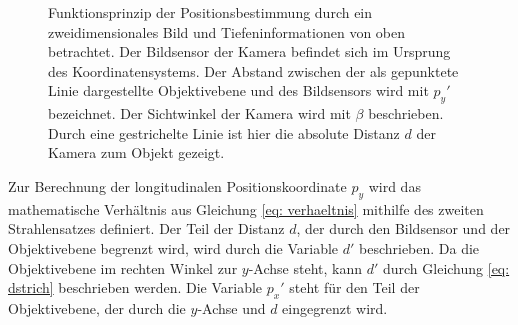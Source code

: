 			\begin{figure}[H]
			\centering
			
			\caption{Funktionsprinzip der Positionsbestimmung durch ein zweidimensionales Bild und Tiefeninformationen von oben betrachtet. Der Bildsensor der Kamera befindet sich im Ursprung des Koordinatensystems. Der Abstand zwischen der als gepunktete Linie dargestellte Objektivebene und des Bildsensors wird mit ${p_y}'$ bezeichnet. Der Sichtwinkel der Kamera wird mit $\beta$ beschrieben. Durch eine gestrichelte Linie ist hier die absolute Distanz $d$ der Kamera zum Objekt gezeigt.}
			\label{fig: positionsbestimmung}
		\end{figure}
		
		Zur Berechnung der longitudinalen Positionskoordinate $p_y$ wird das mathematische Verhältnis aus Gleichung \ref{eq: verhaeltnis} mithilfe des zweiten Strahlensatzes definiert. Der Teil der Distanz $d$, der durch den Bildsensor und der Objektivebene begrenzt wird, wird durch die Variable $d'$ beschrieben. Da die Objektivebene im rechten Winkel zur $y$-Achse steht, kann $d'$ durch Gleichung \ref{eq: dstrich} beschrieben werden. Die Variable ${p_x}'$ steht für den Teil der Objektivebene, der durch die $y$-Achse und $d$ eingegrenzt wird. \\
		
